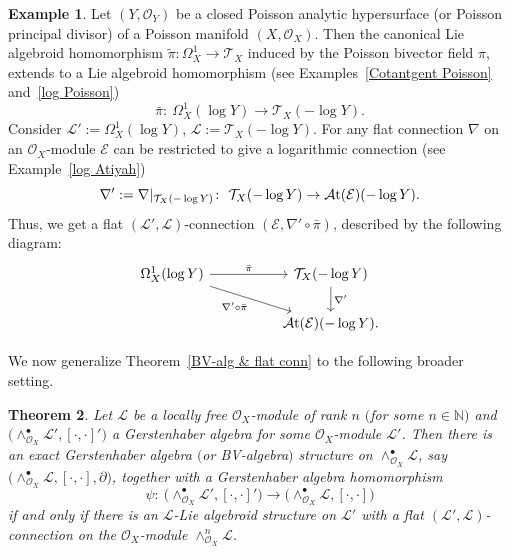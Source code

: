\documentclass[pdftex]{sigma}
\numberwithin{equation}{section}
\newtheorem{Thm}{Theorem}[section]
\theoremstyle{definition}
\newtheorem{Exm}[Thm]{Example}
\begin{document}
 \begin{Exm} \label{log connection}
	Let $(Y, \mathcal{O}_Y)$ be a closed Poisson analytic hypersurface (or Poisson principal divisor) of a Poisson manifold $(X, \mathcal{O}_X)$. Then the canonical Lie algebroid homomorphism $\tilde{\pi}\colon \Omega^1_X \rightarrow \mathcal{T}_X$ induced by the Poisson bivector field $\pi$, extends to a Lie algebroid homomorphism (see Examples~\ref{Cotantgent Poisson} and~\ref{log Poisson})
\[
\bar{\pi}\colon \ \Omega^1_X(\log Y) \rightarrow \mathcal{T}_X(-\log Y).
\]
	Consider $\mathcal{L}':= \Omega^1_X(\log Y)$, $\mathcal{L}:=\mathcal{T}_X(-\log Y)$. For any flat connection $\nabla$ on an $\mathcal{O}_X$-module $\mathcal{E}$ can be restricted to give a logarithmic connection (see Example~\ref{log Atiyah})
\[
\nabla':=\nabla|_{\mathcal{T}_X(-\log Y)}\colon \ \mathcal{T}_X(-\log Y) \rightarrow \mathcal{A}{\rm t}(\mathcal{E})(-\log Y).
\]
	Thus, we get a flat $(\mathcal{L}', \mathcal{L})$-connection $(\mathcal{E}, \nabla' \circ \bar{\pi})$, described by the following diagram:
 \[
 \begin{tikzcd}
	\Omega^1_X(\log Y) && {\mathcal{T}_X(-\log Y)} \\
	&& {\mathcal{A}{\rm t}(\mathcal{E})(-\log Y).}
	\arrow["{\bar{\pi}}", from=1-1, to=1-3]
	\arrow["{\nabla' \circ \bar{\pi}}"', from=1-1, to=2-3]
	\arrow["{\nabla'}", from=1-3, to=2-3]
\end{tikzcd}\]
\end{Exm}
 We now generalize Theorem~\ref{BV-alg & flat conn} to the following broader setting.
\begin{Thm} \label{L-BV alg}
	Let $\mathcal{L}$ be a locally free $\mathcal{O}_X$-module of rank $n$ $($for some $n \in \mathbb{N})$ and $\bigl(\wedge^{\bullet}_{\mathcal{O}_X}\mathcal{L}', [\cdot,\cdot]'\bigr)$ a Gerstenhaber algebra for some $\mathcal{O}_X$-module $\mathcal{L}'$. Then there is an exact Gerstenhaber algebra $($or BV-algebra$)$ structure on $\wedge^{\bullet}_{\mathcal{O}_X}\mathcal{L}$, say $\bigl(\wedge^{\bullet}_{\mathcal{O}_X}\mathcal{L}, [\cdot,\cdot], \partial\bigr)$, together with a Gerstenhaber algebra homomorphism
\[
\psi\colon \ \bigl(\wedge^{\bullet}_{\mathcal{O}_X}\mathcal{L}', [\cdot,\cdot]'\bigr) \rightarrow \bigl(\wedge^{\bullet}_{\mathcal{O}_X}\mathcal{L}, [\cdot,\cdot]\bigr)
\]
	if and only if there is an $\mathcal{L}$-Lie algebroid structure on $\mathcal{L}'$ with a
	flat $(\mathcal{L}',\mathcal{L})$-connection on the $\mathcal{O}_X$-module $\wedge^{n}_{\mathcal{O}_X}\mathcal{L}$.
\end{Thm}
\end{document}
